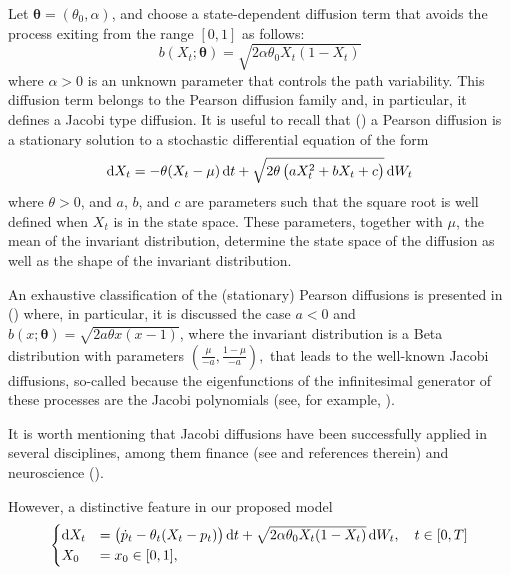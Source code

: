 \documentclass[11pt]{article}
\theoremstyle{definition}
\begin{document}
Let $\bm{\theta} = (\theta_0,\alpha)$, and choose a state-dependent diffusion term that avoids the process exiting from the range $[0,1]$ as follows:
  \begin{equation}
    b (X_t; \bm{\theta} )= \sqrt{2 \alpha \theta_0 X_t (1 - X_t)}
  \end{equation}
  where $\alpha >0$ is an unknown parameter that controls the path variability. This diffusion term belongs to the Pearson diffusion family and, in particular, it defines a Jacobi type diffusion. It is useful to recall that (\cite[440]{foso}) a Pearson diffusion is a stationary solution to a stochastic differential equation of the form \begin{equation}
    \dif X_t = - \theta (X_t - \mu)\dif t + \sqrt{2 \theta \left(a X_t^2 + b X_t + c\right)} \dif W_t
    \label{eq:poly_diff}
  \end{equation}
where $\theta>0$, and $a$, $b$, and $c$ are parameters such that the square root is well defined when $X_t$ is in the state space. These parameters, together with $\mu$, the mean of the invariant distribution, determine the state space of the diffusion as well as the shape of the invariant distribution.

An exhaustive classification of the (stationary) Pearson diffusions is presented in (\cite[440-443]{foso}) where, in particular, it is discussed the case $a < 0$ and $b(x; \bm{\theta}) = \sqrt{2 a \theta x (x-1)}$, where the invariant distribution is a Beta distribution with parameters $\left( \frac{\mu}{-a}, \frac{1 - \mu}{-a} \right),$ that leads to the well-known Jacobi diffusions, so-called because the eigenfunctions of the infinitesimal generator of these processes are the Jacobi polynomials (see, for example, \cite[2860-2861]{leph}). 

It is worth mentioning that Jacobi diffusions have been successfully applied in several disciplines, among them finance (see \cite{vago} and references therein) and neuroscience (\cite{dotala}).

However, a distinctive feature in our proposed model 
\begin{equation}
\begin{cases}
    \dif X_t&= \left(\dot{p}_t  - \theta_t (X_t - p_t) \right) \dif t +\sqrt{2 \alpha \theta_0 X_t (1 - X_t)} \dif W_t, \quad t \in [0,T]  \\
   X_0 &=  x_0\in [0,1] ,
\end{cases}
\label{ourmodel}
\end{equation}
\end{document}

